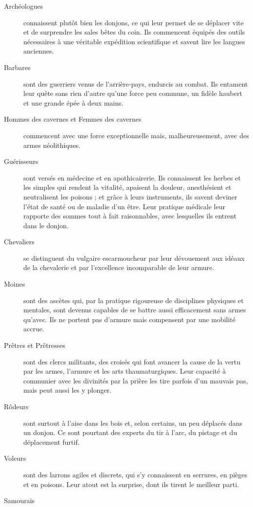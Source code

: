 \documentclass[titlepage]{article}
\begin{document}
%
\begin{description}
\item[Archéologues]
connaissent plutôt bien les donjons, ce qui leur
permet de se déplacer vite et de surprendre les sales bêtes du coin.  Ils
commencent équipés des outils nécessaires à une véritable expédition
scientifique et savent lire les langues anciennes.
%
\item[Barbares]
sont des guerriers venus de l'arrière-pays, endurcis au combat.
Ils entament leur quête sans rien d'autre qu'une force peu commune, un fidèle
haubert et une grande épée à deux mains.
%
\item[Hommes des cavernes \textrm{\textmd{et}} Femmes des cavernes]
commencent avec une force exceptionnelle mais, malheureusement, avec des armes néolithiques.
%
\item[Guérisseurs]
sont versés en médecine et en apothicairerie.  Ils
connaissent les herbes et les simples qui rendent la vitalité, apaisent la
douleur, anesthésient et neutralisent
les poisons ; et grâce à leurs instruments, ils savent deviner l'état de santé
ou de maladie d'un être.  Leur pratique médicale leur rapporte des sommes tout
à fait raisonnables, avec lesquelles ils entrent dans le donjon.
%
\item[Chevaliers]
se distinguent du vulgaire escarmoucheur par leur
dévouement aux idéaux de la chevalerie et par l'excellence incomparable
de leur armure.
%
\item[Moines]
sont des ascètes qui, par la pratique rigoureuse de
disciplines physiques et mentales, sont devenus capables de se battre aussi
efficacement sans armes qu'avec.  Ils ne portent pas d'armure mais compensent
par une mobilité accrue.
%
\item[Prêtres \textrm{\textmd{et}} Prêtresses]
sont des clercs militants, des croisés
qui font avancer la cause de la vertu par les armes, l'armure et les arts
thaumaturgiques.  Leur capacité à communier avec les divinités par la prière
les tire parfois d'un mauvais pas, mais peut aussi les y plonger.
%
\item[Rôdeurs]
sont surtout à l'aise dans les bois et, selon certains,
un peu déplacés dans un donjon.  Ce sont pourtant des experts du tir à l'arc,
du pistage et du déplacement furtif.
%
\item[Voleurs]
sont des larrons agiles et discrets, qui s'y connaissent en
serrures, en pièges et en poisons.  Leur atout est la surprise, dont ils
tirent le meilleur parti.
%
\item[Samouraïs]

\end{description}
\end{document}
